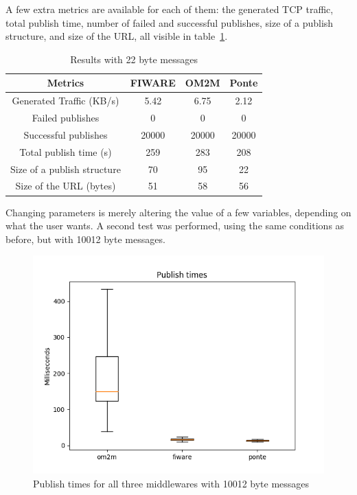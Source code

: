 \documentclass[conference]{IEEEtran}
\begin{document}
A few extra metrics are available for each of them: the generated TCP traffic, total publish time, number of failed and successful publishes, size of a publish structure, and size of the URL, all visible in table~\ref{tab:misc_metrics_all_22}.

\begin{table}[htbp!]
  \centering
  \begin{tabular}{|c|c|c|c|}
    \hline 
    \textbf{Metrics} & \textbf{FIWARE} & \textbf{OM2M} & \textbf{Ponte} \\
    \hline 
    Generated Traffic (KB/s) & 5.42 & 6.75 & 2.12 \\
    \hline 
    Failed publishes & 0 & 0 & 0 \\
    \hline 
    Successful publishes & 20000 & 20000 & 20000 \\
    \hline 
    Total publish time (s) & 259 & 283 & 208 \\
    \hline 
    Size of a publish structure & 70 & 95 & 22 \\
    \hline 
    Size of the URL (bytes) & 51 & 58 & 56 \\
    \hline 
    
  \end{tabular}
  \vspace{1mm}
  \caption{Results with 22 byte messages}
  \label{tab:misc_metrics_all_22}
\end{table}

Changing parameters is merely altering the value of a few variables, depending on what the user wants. A second test was performed, using the same conditions as before, but with 10012 byte messages.

\begin{figure}[htbp!]
  \centering
  \includegraphics[width=\columnwidth]{figures/om2m_fiware_ponte_publish_times_10000.png}
  \caption{Publish times for all three middlewares with 10012 byte messages}
  \label{fig:publish_times_10000}
\end{figure}
\end{document}
